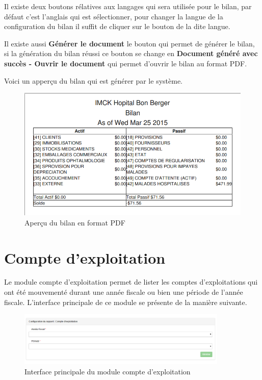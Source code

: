 \documentclass[12pt,a4paper]{report}
\begin{document}
Il existe deux boutons rélatives aux langages qui sera utilisée pour le bilan, par défaut c'est l'anglais qui est sélectionner, pour changer la langue de la configuration du bilan il suffit de cliquer sur le bouton de la dite langue.

Il existe aussi \textbf{Générer le document} le bouton qui permet de générer le bilan, si la génération du bilan  réussi ce bouton se change en \textbf{Document généré avec succès - Ouvrir le document} qui permet d'ouvrir le bilan au format PDF.

Voici un apperçu du bilan qui est générer par le système.
 
\begin{figure}[h]
\begin{center}
\includegraphics[width=14cm]{pic/bilanOverView.png}
\end{center}
\caption{Aperçu du bilan en format PDF}
\label{Aperçu du bilan en format PDF}
\end{figure}


\newpage
\section{Compte d'exploitation}
Le module compte d'exploitation permet de lister les comptes d'exploitations qui ont été mouvementé durant une année fiscale ou bien une période de l'année fiscale. L'interface principale de ce module se présente de la manière suivante.

\begin{figure}[h]
\begin{center}
\includegraphics[width=10cm]{pic/ComptExploitation.png}
\end{center}
\caption{Interface principale du module compte d'exploitation}
\label{Interface principale du module compte d'exploitation}
\end{figure}
\end{document}

